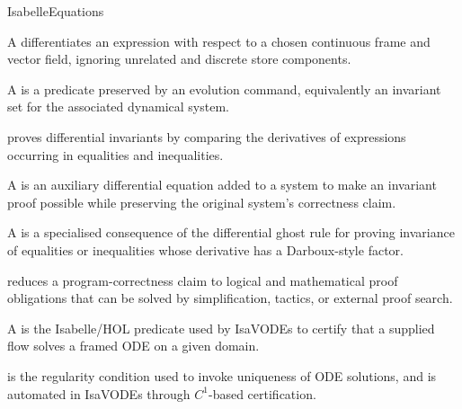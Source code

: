 \documentclass[hidelinks]{article}
\begin{document}
\begin{smodule}[title={IsaVODEs: Interactive Verification of Cyber-Physical Systems at Scale}]{IsabelleEquations}
\begin{sdefinition}[for=FramedFrechetDerivative]
    A  differentiates an expression with respect to a chosen continuous frame and vector field, ignoring unrelated and discrete store components.
\end{sdefinition}

\begin{sdefinition}[for=DifferentialInvariant]
    A  is a predicate preserved by an evolution command, equivalently an invariant set for the associated dynamical system.
\end{sdefinition}

\begin{sdefinition}[for=DifferentialInduction]
     proves differential invariants by comparing the derivatives of expressions occurring in equalities and inequalities.
\end{sdefinition}

\begin{sdefinition}[for=DifferentialGhost]
    A  is an auxiliary differential equation added to a system to make an invariant proof possible while preserving the original system's correctness claim.
\end{sdefinition}

\begin{sdefinition}[for=DarbouxRule]
    A  is a specialised consequence of the differential ghost rule for proving invariance of equalities or inequalities whose derivative has a Darboux-style factor.
\end{sdefinition}

\begin{sdefinition}[for=VerificationConditionGeneration]
     reduces a program-correctness claim to logical and mathematical proof obligations that can be solved by simplification, tactics, or external proof search.
\end{sdefinition}

\begin{sdefinition}[for=LocalFlow]
    A  is the Isabelle/HOL predicate used by IsaVODEs to certify that a supplied flow solves a framed ODE on a given domain.
\end{sdefinition}

\begin{sdefinition}[for=LipschitzContinuity]
     is the regularity condition used to invoke uniqueness of ODE solutions, and is automated in IsaVODEs through \(C^1\)-based certification.
\end{sdefinition}


\end{smodule}
\end{document}
